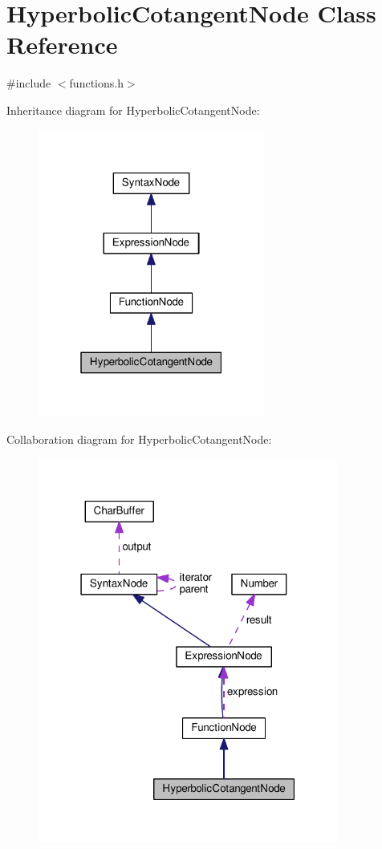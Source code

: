 \hypertarget{classHyperbolicCotangentNode}{}\section{Hyperbolic\+Cotangent\+Node Class Reference}
\label{classHyperbolicCotangentNode}


{\ttfamily \#include $<$functions.\+h$>$}



Inheritance diagram for Hyperbolic\+Cotangent\+Node\+:\nopagebreak
\begin{figure}[H]
\begin{center}
\leavevmode
\includegraphics[width=211pt]{classHyperbolicCotangentNode__inherit__graph}
\end{center}
\end{figure}


Collaboration diagram for Hyperbolic\+Cotangent\+Node\+:\nopagebreak
\begin{figure}[H]
\begin{center}
\leavevmode
\includegraphics[width=279pt]{classHyperbolicCotangentNode__coll__graph}
\end{center}
\end{figure}
